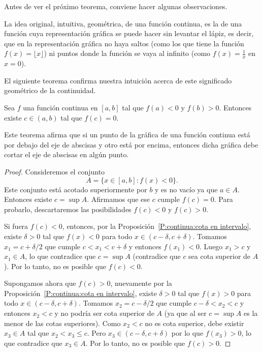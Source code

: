 Antes de ver el próximo teorema, conviene hacer algunas observaciones.

La idea original, intuitiva, geométrica, de una función continua, es la de una función cuya representación gráfica se puede hacer sin levantar el lápiz, es decir, que en la representación gráfica no haya saltos (como los que tiene la función $f(x)=\lfloor x\rfloor$) ni puntos donde la función se vaya al infinito (como $f(x)=\frac1x$ en $x=0$).

El siguiente teorema confirma nuestra intuición acerca de este significado geométrico de la continuidad.

\begin{theorem}\label{T:Bolzano}
Sea $f$ una función continua en $[a,b]$ tal que $f(a)<0$ y $f(b)>0$. Entonces existe $c\in(a,b)$ tal que $f(c)=0$.
\end{theorem}

Este teorema afirma que si un punto de la gráfica de una función continua está por debajo del eje de abscisas y otro está por encima, entonces dicha gráfica debe cortar el eje de abscisas en algún punto.

\begin{proof}
    Consideremos el conjunto
    \[
    A=\{x\in[a,b]:f(x)<0\}.
    \]
    Este conjunto está acotado superiormente por $b$ y es no vacío ya que $a\in A$.
    Entonces existe $c=\sup A$. Afirmamos que ese $c$ cumple $f(c)=0$. Para probarlo, descartaremos las posibilidades $f(c)<0$ y $f(c)>0$.

    Si fuera $f(c)<0$, entonces, por la Proposición~\ref{P:continua:cota en intervalo}, existe $\delta>0$ tal que $f(x)<0$ para todo $x\in(c-\delta,c+\delta)$. Tomamos $x_1=c+\delta/2$ que cumple $c<x_1<c+\delta$ y entonces $f(x_1)<0$. Luego $x_1>c$ y $x_1\in A$, lo que contradice que $c=\sup A$ (contradice que $c$ sea cota superior de $A$). Por lo tanto, no es posible que $f(c)<0$.

    Supongamos ahora que $f(c)>0$, nuevamente por la Proposición~\ref{P:continua:cota en intervalo}, existe $\delta>0$ tal que $f(x)>0$ para todo $x\in (c-\delta,c+\delta)$. Tomamos $x_2=c-\delta/2$ que cumple $c-\delta<x_2<c$ y entonces $x_2<c$ y no podría ser cota superior de $A$ (ya que al ser $c=\sup A$ es la menor de las cotas superiores).
    Como $x_2<c$ no es cota superior, debe existir $x_3\in A$ tal que $x_2<x_3\le c$. Pero $x_3\in(c-\delta,c+\delta)$ por lo que $f(x_3)>0$, lo que contradice que $x_3\in A$.
    Por lo tanto, no es posible que $f(c)>0$.
\end{proof}

